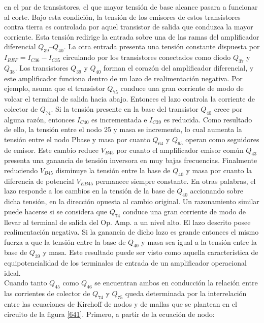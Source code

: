 \documentclass[12pt,a4paper,final,headinclude,footinclude,BCOR5mm]{scrartcl}
\begin{document}
en el par de transistores, el que mayor tensión de base alcance pasara a funcionar al corte. Bajo esta condición, la tensión de los emisores de estos transistores contra tierra es controlada por aquel transistor de salida que conduzca la mayor corriente. Esta tensión redirige la entrada sobre una de las ramas del amplificador diferencial $Q_{39} – Q_{40}$. La otra entrada presenta una tensión constante dispuesta por $I_{REF} = I_{C36} - I_{C35}$  circulando por los transistores conectados como diodo $Q_{37}$ y $Q_{38}$. Los transistores $Q_{39}$ y $Q_{40}$ forman el corazón del amplificador diferencial, y este amplificador funciona dentro de un lazo de realimentación negativa. Por ejemplo, asuma que el transistor $Q_{75}$ conduce una gran corriente de modo de volcar el terminal de salida hacia abajo. Entonces el lazo controla la corriente de colector de $Q_{74}$. Si la tensión presente en la base del transistor $Q_{40}$ crece por alguna razón, entonces $I_{C40}$ es incrementada e $I_{C39}$ es reducida. Como resultado de ello, la tensión entre el nodo 25 y masa se incrementa, lo cual aumenta la tensión entre el nodo Pbase y masa por cuanto $Q_{64}$ y $Q_{65}$ operan como seguidores de emisor. Este cambio reduce $V_{B45}$ por cuanto el amplificador emisor común $Q_{43}$ presenta una ganancia de tensión inversora en muy bajas frecuencias. Finalmente reduciendo $V_{B45}$ disminuye la tensión entre la base de $Q_{40}$ y masa por cuanto la diferencia de potencial $V_{EB45}$ permanece siempre constante. En otras palabras, el lazo responde a los cambios en la tensión de la base de $Q_{40}$ accionando sobre dicha tensión, en la dirección opuesta al cambio original. Un razonamiento similar puede hacerse si se considera que $Q_{74}$ conduce una gran corriente  de modo de llevar al terminal de salida del Op. Amp. a un nivel alto. El lazo descrito posee realimentación negativa. Si la ganancia de dicho lazo es grande entonces el mismo fuerza a que la tensión entre la base de $Q_{40}$ y masa sea igual a la tensión entre la base de $Q_{39}$ y masa. Este resultado puede ser visto como aquella característica de equipotencialidad de los terminales de entrada de un amplificador operacional ideal.\\

Cuando tanto $Q_{45}$ como $Q_{46}$ se encuentran ambos en conducción la relación entre las corrientes de colector de $Q_{74}$ y $Q_{75}$ queda determinada por la interrelación entre las ecuaciones de Kirchoff de nodos y de mallas que se plantean en el circuito de la figura \ref{641}. Primero, a partir de la ecuación de nodo:
\end{document}
